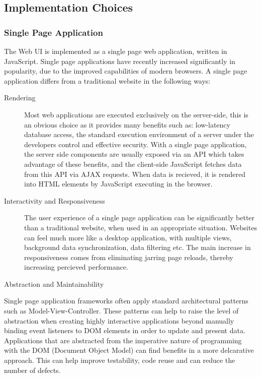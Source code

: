 \documentclass{cshonours}
\begin{document}
\subsection{Implementation Choices}

\subsubsection{Single Page Application}

The Web UI is implemented as a single page web application, written in JavaScript. Single page applications have recently increased significantly in popularity, due to the improved capabilities of modern browsers. A single page application differs from a traditional website in the following ways:

\begin{description}
  \item[Rendering]
    Most web applications are executed exclusively on the server-side, this is an obvious choice as it provides many benefits such as: low-latency database access, the standard execution environment of a server under the developers control and effective security. With a single page application, the server side components are usually exposed via an API which takes advantage of these benefits, and the client-side JavaScript fetches data from this API via AJAX requests. When data is recieved, it is rendered into HTML elements by JavaScript executing in the browser.
  \item[Interactivity and Responsiveness]
    The user experience of a single page application can be significantly better than a traditional website, when used in an appropriate situation. Websites can feel much more like a desktop application, with multiple views, background data synchronization, data filtering etc. The main increase in responsiveness comes from eliminating jarring page reloads, thereby increasing percieved performance.
\end{description}

Abstraction and Maintainability

    Single page application frameworks often apply standard architectural patterns such as Model-View-Controller. These patterns can help to raise the level of abstraction when creating highly interactive applications beyond manually binding event listeners to DOM elements in order to update and present data. Applications that are abstracted from the imperative nature of programming with the DOM (Document Object Model) can find benefits in a more delcarative approach. This can help improve testability, code reuse and can reduce the number of defects.
\end{document}
